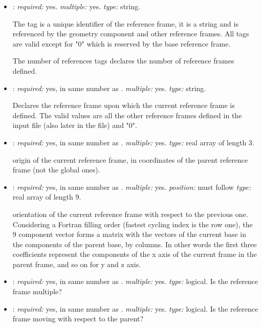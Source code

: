 \begin{itemize}
\item {}: \textit{required:} yes. \textit{multiple:} yes. \textit{type:} string.

The tag is a unique identifier of the reference frame, it is a string and is referenced by the geometry component and other reference frames. All tags are valid except for "0" which is reserved by the base reference frame. 

The number of references tags declares the number of reference frames defined.

\item {}: \textit{required:} yes, in same number as . \textit{multiple:} yes. \textit{type:} string.

Declares the reference frame upon which the current reference frame is defined. The valid values are all the other reference frames defined in the input file (also later in the file) and "0". 

\item {}: \textit{required:} yes, in same number as . \textit{multiple:} yes. \textit{type:} real array of length 3.

origin of the current reference frame, in coordinates of the parent reference frame (not the global ones). 

\item {}: \textit{required:} yes, in same number as . \textit{multiple:} yes. \textit{position:} must follow  \textit{type:} real array of length 9.

orientation of the current reference frame with respect to the previous one. Considering a Fortran filling order (fastest cycling index is the row one), the 9 component vector forms a matrix with the vectors of the current base in the components of the parent base, by columns. In other words the first three coefficients represent the components of the x axis of the current frame in the parent frame, and so on for y and z axis. 
 
\item {}: \textit{required:} yes, in same number as . \textit{multiple:} yes. \textit{type:} logical.
 Is the reference frame multiple? 

\item {}: \textit{required:} yes, in same number as . \textit{multiple:} yes. \textit{type:} logical.
 Is the reference frame moving with respect to the parent? 
\end{itemize}

